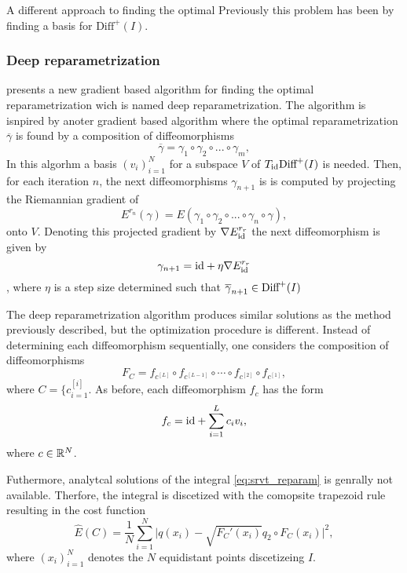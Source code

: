 A different approach to finding the optimal 
Previously this problem has been by finding a basis for  \(\text{Diff}^+(I) \). 

\subsubsection{Deep reparametrization}
\citeauthor{jørgen2021} \cite{jørgen2021} presents a new gradient based algorithm for finding the optimal reparametrization wich is named deep reparametrization. The algorithm is isnpired by anoter gradient based algorithm where the optimal reparametrization \(\overline \gamma\) is found by a composition of diffeomorphisms
\begin{equation}
  \overline \gamma = \gamma_1 \circ \gamma_2 \circ ... \circ \gamma_m, 
\end{equation}
In this algorhm a basis \((v_i)_{i=1}^{N}\) for a subspace \(V\) of \( T_{\text{id}}\text{Diff}^+( I )\) is needed. Then, for each iteration \(n\), the next diffeomorphisms \(\gamma_{n+1}\) is is computed by projecting the Riemannian gradient of 
\begin{equation}
  E^{r_n}(\gamma) = E(\gamma_1 \circ \gamma_2 \circ ... \circ \gamma_n \circ \gamma),   
\end{equation}
onto \(V\). Denoting this projected gradient by \(\nabla E_{\text{id}}^{r_r}\) the next diffeomorphism is given by 
\begin{equation}
  \gamma_{n+1} = \text{id} + \eta \nabla E_{\text{id}}^{r_r} 
\end{equation}
, where \(\eta\) is a step size determined such that \(\overline \gamma_{n+1} \in \text{Diff}^+( I )\) 

The deep reparametrization algorithm produces similar solutions as the method previously described, but the optimization procedure is different. Instead of determining each diffeomorphism sequentially, one considers the composition of diffeomorphisms 
\begin{equation}
  F_{C} = f_{c^{[L]}}\circ f_{c^{[L-1]}} \circ \cdots \circ f_{c^{[2]}} \circ f_{c^{[1]}},
\end{equation}
where \(C = \{c^{[i]}_{i=1}\). As before, each diffeomorphism \(f_{c}\) has the form 
\begin{equation}
  f_{c}= \text{id} +  \sum_{i=1}^{L} c_i v_i, 
\end{equation}
where \(c \in \mathbb{R}^N \). 

Futhermore, analytcal solutions of the integral \eqref{eq:srvt_reparam} is genrally not available. Therfore, the integral is discetized with the comopsite trapezoid rule resulting in the cost function 
\begin{equation}
  \hat E(C) = \frac{1}{N} \sum_{i = 1}^N {\vert q(x_i)- \sqrt{ F_C'(x_i)}q_2 \circ F_C(x_i) \vert^2}, 
\end{equation}
where \((x_i)_{i=1}^N\) denotes the \(N\) equidistant points discetizeing \(I\). 

